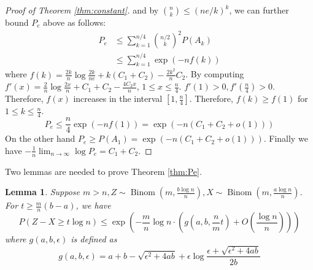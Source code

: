 \documentclass[conference]{IEEEtran}
\newtheorem{lemma}{Lemma}
\DeclareMathOperator{\Binom}{Binom}
\begin{document}
\begin{proof}[Proof of Theorem \ref{thm:constant}]
and by $\binom{n}{k} \leq (ne/k)^k$, we can further bound $P_e$ above as follows:
\begin{align*}
P_e & \leq \sum_{k=1}^{n/4} \binom{n/2}{k}^2 P(A_k) \\
& \leq \sum_{k=1}^{n/4} \exp(-nf(k))
\end{align*}
where $f(k) = \frac{2k}{n}\log \frac{2k}{ne} + k(C_1+C_2) - \frac{2k^2}{n}C_2$.
By computing $f'(x)= \frac{2}{n} \log \frac{2x}{n} + C_1+C_2 - \frac{4C_2x}{n}$, $1\leq x \leq \frac{n}{4}$.
$f'(1) > 0 , f'(\frac{n}{4}) > 0$. Therefore, $f(x)$ increases in the interval $[1, \frac{n}{4}]$.
Therefore, $f(k) \geq f(1)$ for $1\leq k \leq \frac{n}{4}$.
\begin{equation}
P_e \leq \frac{n}{4}\exp(-nf(1)) = \exp(-n (C_1+C_2+o(1)))
\end{equation}
On the other hand $P_e \geq P(A_1) = \exp(-n(C_1+C_2+o(1)))$.
Finally we have $-\frac{1}{n} \lim_{n \to \infty} \log P_e = C_1+C_2$.
\end{proof}
Two lemmas are needed to prove Theorem \ref{thm:Pe}.
\begin{lemma}\label{lem:zxt}
	Suppose $m > n, Z \sim \Binom(m, \frac{b\log n}{n}), X\sim \Binom(m, \frac{a\log n}{n})$.
	For $ t \geq \frac{m}{n}(b - a)$, we have
	\begin{equation}\label{eq:estimation}
	P(Z - X \geq t \log n) \leq \exp(-\frac{m}{n}\log n \cdot ( g(a, b, \frac{n}{m}t) + O(\frac{\log n}{n})))
	\end{equation}
	where $g(a,b,\epsilon)$ is defined as
	\begin{equation}\label{eq:gab}
	g(a,b,\epsilon) = a + b - \sqrt{\epsilon^2 + 4ab} + \epsilon \log \frac{\epsilon + \sqrt{\epsilon^2 + 4ab}}{2b}
	\end{equation}
\end{lemma}
\end{document}
